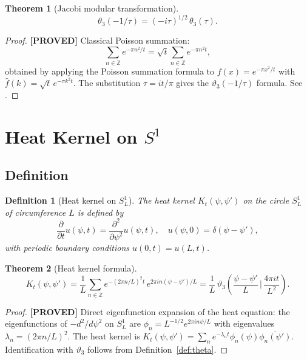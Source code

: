 \documentclass[11pt,a4paper]{article}
\newtheorem{theorem}{Theorem}
\newtheorem{definition}{Definition}
\newcommand{\proved}[1]{\textbf{[PROVED]} #1}
\begin{document}
\begin{theorem}[Jacobi modular transformation]
  \label{thm:modular}
  \[
    \theta_3(-1/\tau) = (-i\tau)^{1/2}\, \theta_3(\tau).
  \]
\end{theorem}

\begin{proof}
  \proved{} Classical Poisson summation:
  \[
    \sum_{n\in\mathbb{Z}} e^{-\pi n^2/t}
    = \sqrt{t}\sum_{n\in\mathbb{Z}} e^{-\pi n^2 t},
  \]
  obtained by applying the Poisson summation formula to $f(x) = e^{-\pi x^2/t}$
  with $\hat{f}(k) = \sqrt{t}\, e^{-\pi k^2 t}$.  The substitution $\tau = it/\pi$
  gives the $\vartheta_3(-1/\tau)$ formula.
  See \cite[Ch.\ 10]{Apostol}.
\end{proof}

\section{Heat Kernel on \texorpdfstring{$S^1$}{S1}}

\subsection{Definition}

\begin{definition}[Heat kernel on $S^1_{L}$]
  The heat kernel $K_t(\psi, \psi')$ on the circle $S^1_L$ of circumference $L$
  is defined by
  \[
    \frac{\partial}{\partial t} u(\psi, t) = \frac{\partial^2}{\partial\psi^2} u(\psi,t),
    \quad u(\psi, 0) = \delta(\psi - \psi'),
  \]
  with periodic boundary conditions $u(0,t) = u(L,t)$.
\end{definition}

\begin{theorem}[Heat kernel formula]
  \label{thm:heatkernel}
  \[
    K_t(\psi,\psi') = \frac{1}{L}\sum_{n\in\mathbb{Z}} e^{-(2\pi n/L)^2 t}\,
    e^{2\pi i n(\psi-\psi')/L}
    = \frac{1}{L}\,\vartheta_3\!\left(\frac{\psi-\psi'}{L}\,\bigg|\,
    \frac{4\pi i t}{L^2}\right).
  \]
\end{theorem}

\begin{proof}
  \proved{} Direct eigenfunction expansion of the heat equation:
  the eigenfunctions of $-d^2/d\psi^2$ on $S^1_L$ are $\phi_n = L^{-1/2}e^{2\pi in\psi/L}$
  with eigenvalues $\lambda_n = (2\pi n/L)^2$.  The heat kernel is
  $K_t(\psi,\psi') = \sum_n e^{-\lambda_n t}\phi_n(\psi)\overline{\phi_n(\psi')}$.
  Identification with $\vartheta_3$ follows from Definition~\ref{def:theta}.
\end{proof}
\end{document}
